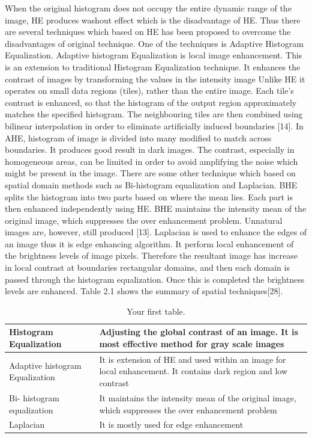 When the original histogram does not occupy the entire dynamic range of the image, HE produces washout effect which is the disadvantage of HE. Thus there are several techniques which based on HE has been proposed to overcome the disadvantages of original technique. One of the techniques is Adaptive Histogram Equalization. Adaptive histogram Equalization is local image enhancement. This is an extension to traditional Histogram Equalization technique. It enhances the contrast of images by transforming the values in the intensity image Unlike HE it operates on small data regions (tiles), rather than the entire image. Each tile's contrast is enhanced, so that the histogram of the output region approximately matches the specified histogram. The neighbouring tiles are then combined using bilinear interpolation in order to eliminate artificially induced boundaries [14]. In AHE, histogram of image is divided into many modified to match across boundaries. It produces good result in dark images. The contrast, especially in homogeneous areas, can be limited in order to avoid amplifying the noise which might be present in the image. There are some other technique which based on spatial domain methods such as Bi-histogram equalization and Laplacian. BHE splits the histogram into two parts based on where the mean lies. Each part is then enhanced independently using HE. BHE maintains the intensity mean of the original image, which suppresses the over enhancement problem. Unnatural images are, however, still produced [13]. Laplacian is used to enhance the edges of an image thus it is edge enhancing algorithm. It perform local enhancement of the brightness levels of image pixels. Therefore the resultant image has increase in local contrast at boundaries rectangular domains, and then each domain is passed through the histogram equalization. Once this is completed the brightness levels are enhanced.  Table 2.1 shows the summary of spatial techniques[28].

\begin{table}[h!]
	\begin{center}
	\caption{Your first table.}
    \label{tab:table1}
	\begin{tabular}{ | m{4cm} | m{8cm}| }
	\hline
		Histogram Equalization & Adjusting the global contrast of an image. It is most effective method for gray scale images \\
	\hline
		Adaptive histogram Equalization & It is extension of HE and used within an image for local enhancement. It contains dark region and low contrast \\ 
	\hline
		Bi- histogram equalization & It maintains the intensity mean of the original image, which suppresses the over enhancement problem \\ 
	\hline
		Laplacian & It is mostly used for edge enhancement \\ 
	\hline
	\end{tabular}
	\end{center}

\end{table}

